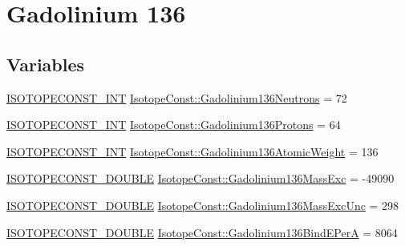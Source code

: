 \hypertarget{group___isotope_const-_gadolinium-_gd136}{}\section{Gadolinium 136}
\label{group___isotope_const-_gadolinium-_gd136}
\subsection*{Variables}
\begin{DoxyCompactItemize}
\item 
\mbox{\hyperlink{group___isotope_const-_macros_ga5f18360b3e99483a35c32d789e62621c}{I\+S\+O\+T\+O\+P\+E\+C\+O\+N\+S\+T\+\_\+\+I\+NT}} \mbox{\hyperlink{group___isotope_const-_gadolinium-_gd136_gad8abaaff7b7fc3d4dc0379a844b809d7}{Isotope\+Const\+::\+Gadolinium136\+Neutrons}} = 72
\item 
\mbox{\hyperlink{group___isotope_const-_macros_ga5f18360b3e99483a35c32d789e62621c}{I\+S\+O\+T\+O\+P\+E\+C\+O\+N\+S\+T\+\_\+\+I\+NT}} \mbox{\hyperlink{group___isotope_const-_gadolinium-_gd136_ga40f8bc38f4e399ad56b9b05cbeda7957}{Isotope\+Const\+::\+Gadolinium136\+Protons}} = 64
\item 
\mbox{\hyperlink{group___isotope_const-_macros_ga5f18360b3e99483a35c32d789e62621c}{I\+S\+O\+T\+O\+P\+E\+C\+O\+N\+S\+T\+\_\+\+I\+NT}} \mbox{\hyperlink{group___isotope_const-_gadolinium-_gd136_ga198a27f918d95476a1be4769c9e2b503}{Isotope\+Const\+::\+Gadolinium136\+Atomic\+Weight}} = 136
\item 
\mbox{\hyperlink{group___isotope_const-_macros_ga8f45a7272ce02c0b4c65c44636ed719a}{I\+S\+O\+T\+O\+P\+E\+C\+O\+N\+S\+T\+\_\+\+D\+O\+U\+B\+LE}} \mbox{\hyperlink{group___isotope_const-_gadolinium-_gd136_gae98b64f656a8573708549ad0cc635ec3}{Isotope\+Const\+::\+Gadolinium136\+Mass\+Exc}} = -\/49090
\item 
\mbox{\hyperlink{group___isotope_const-_macros_ga8f45a7272ce02c0b4c65c44636ed719a}{I\+S\+O\+T\+O\+P\+E\+C\+O\+N\+S\+T\+\_\+\+D\+O\+U\+B\+LE}} \mbox{\hyperlink{group___isotope_const-_gadolinium-_gd136_gad1fac0a3f36b895cccc48364f8096b95}{Isotope\+Const\+::\+Gadolinium136\+Mass\+Exc\+Unc}} = 298
\item 
\mbox{\hyperlink{group___isotope_const-_macros_ga8f45a7272ce02c0b4c65c44636ed719a}{I\+S\+O\+T\+O\+P\+E\+C\+O\+N\+S\+T\+\_\+\+D\+O\+U\+B\+LE}} \mbox{\hyperlink{group___isotope_const-_gadolinium-_gd136_gada5c14cc915221dd71511baaec48dc67}{Isotope\+Const\+::\+Gadolinium136\+Bind\+E\+PerA}} = 8064
\item 

\end{DoxyCompactItemize}
